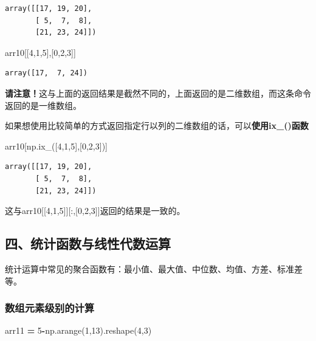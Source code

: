 \documentclass[]{article}
\newenvironment{Shaded}{\begin{snugshade}}{\end{snugshade}}
\newcommand{\DecValTok}[1]{\textcolor[rgb]{0.00,0.00,0.81}{#1}}
\newcommand{\OperatorTok}[1]{\textcolor[rgb]{0.81,0.36,0.00}{\textbf{#1}}}
\newcommand{\NormalTok}[1]{#1}
\begin{document}
\begin{verbatim}
array([[17, 19, 20],
       [ 5,  7,  8],
       [21, 23, 24]])
\end{verbatim}

\begin{Shaded}
\begin{Highlighting}[]
\NormalTok{ arr10[[}\DecValTok{4}\NormalTok{,}\DecValTok{1}\NormalTok{,}\DecValTok{5}\NormalTok{],[}\DecValTok{0}\NormalTok{,}\DecValTok{2}\NormalTok{,}\DecValTok{3}\NormalTok{]]}
\end{Highlighting}
\end{Shaded}

\begin{verbatim}
array([17,  7, 24])
\end{verbatim}

\textbf{请注意！}这与上面的返回结果是截然不同的，上面返回的是二维数组，而这条命令返回的是一维数组。

如果想使用比较简单的方式返回指定行以列的二维数组的话，可以\textbf{使用ix\_()函数}

\begin{Shaded}
\begin{Highlighting}[]
\NormalTok{arr10[np.ix_([}\DecValTok{4}\NormalTok{,}\DecValTok{1}\NormalTok{,}\DecValTok{5}\NormalTok{],[}\DecValTok{0}\NormalTok{,}\DecValTok{2}\NormalTok{,}\DecValTok{3}\NormalTok{])]}
\end{Highlighting}
\end{Shaded}

\begin{verbatim}
array([[17, 19, 20],
       [ 5,  7,  8],
       [21, 23, 24]])
\end{verbatim}

这与arr10{[}{[}4,1,5{]}{]}{[}:,{[}0,2,3{]}{]}返回的结果是一致的。

\subsection{四、统计函数与线性代数运算}

统计运算中常见的聚合函数有：最小值、最大值、中位数、均值、方差、标准差等。

\subsubsection{数组元素级别的计算}

\begin{Shaded}
\begin{Highlighting}[]
\NormalTok{arr11 }\OperatorTok{=} \DecValTok{5}\OperatorTok{-}\NormalTok{np.arange(}\DecValTok{1}\NormalTok{,}\DecValTok{13}\NormalTok{).reshape(}\DecValTok{4}\NormalTok{,}\DecValTok{3}\NormalTok{)}
\end{Highlighting}
\end{Shaded}
\end{document}
